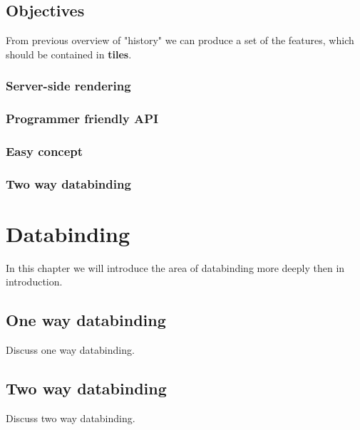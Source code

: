 \documentclass[oneside, 12pt]{book}
\begin{document}
\section{Objectives}\label{sec:objectives}

From previous overview of "history" we can produce a set of the features, 
which should be contained in \textbf{tiles}.

\subsection{Server-side rendering}\label{subsec:objectives-server-side-rendering}
\subsection{Programmer friendly API}\label{subsec:objectives-friendly-api}
\subsection{Easy concept}\label{subsec:objectives-easy-concept}
\subsection{Two way databinding}\label{subsec:objectives-two-way-databinding}


\chapter{Databinding}\label{chap:databinding}

In this chapter we will introduce the area of databinding more deeply then in introduction.

\section{One way databinding}\label{sec:onewaydatabinding}

Discuss one way databinding.

\section{Two way databinding}

Discuss two way databinding.

\end{document}

